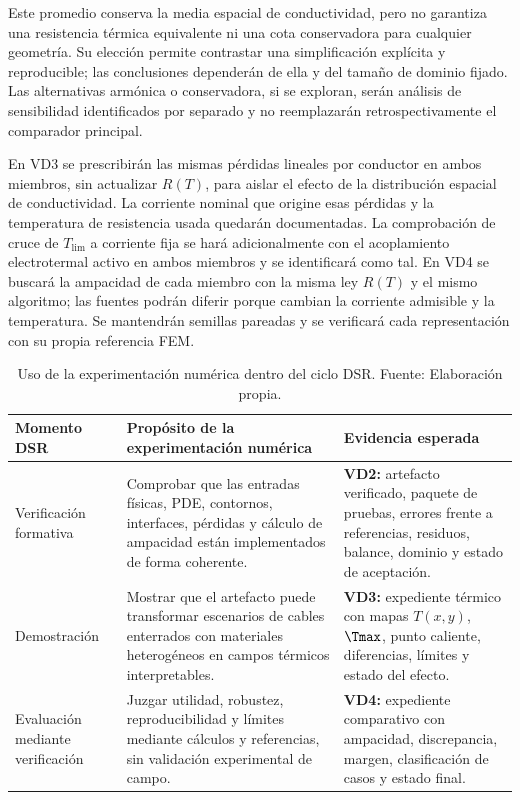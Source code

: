 Este promedio conserva la media espacial de conductividad, pero no garantiza una resistencia térmica equivalente ni una cota conservadora para cualquier geometría. Su elección permite contrastar una simplificación explícita y reproducible; las conclusiones dependerán de ella y del tamaño de dominio fijado. Las alternativas armónica o conservadora, si se exploran, serán análisis de sensibilidad identificados por separado y no reemplazarán retrospectivamente el comparador principal.

En VD3 se prescribirán las mismas pérdidas lineales por conductor en ambos miembros, sin actualizar $R(T)$, para aislar el efecto de la distribución espacial de conductividad. La corriente nominal que origine esas pérdidas y la temperatura de resistencia usada quedarán documentadas. La comprobación de cruce de $T_{\mathrm{lim}}$ a corriente fija se hará adicionalmente con el acoplamiento electrotermal activo en ambos miembros y se identificará como tal. En VD4 se buscará la ampacidad de cada miembro con la misma ley $R(T)$ y el mismo algoritmo; las fuentes podrán diferir porque cambian la corriente admisible y la temperatura. Se mantendrán semillas pareadas y se verificará cada representación con su propia referencia FEM.

\begin{table}[htbp]
\centering
\caption{Uso de la experimentación numérica dentro del ciclo DSR. Fuente: Elaboración propia.}
\label{tab:experimentacion-dsr}
\begin{tabularx}{\textwidth}{L{3.2cm}Y Y}
\toprule
\textbf{Momento DSR} & \textbf{Propósito de la experimentación numérica} & \textbf{Evidencia esperada} \\
\midrule
Verificación formativa & Comprobar que las entradas físicas, PDE, contornos, interfaces, pérdidas y cálculo de ampacidad están implementados de forma coherente. & \textbf{VD2:} artefacto verificado, paquete de pruebas, errores frente a referencias, residuos, balance, dominio y estado de aceptación. \\
Demostración & Mostrar que el artefacto puede transformar escenarios de cables enterrados con materiales heterogéneos en campos térmicos interpretables. & \textbf{VD3:} expediente térmico con mapas $T(x,y)$, $\Tmax$, punto caliente, diferencias, límites y estado del efecto. \\
Evaluación mediante verificación & Juzgar utilidad, robustez, reproducibilidad y límites mediante cálculos y referencias, sin validación experimental de campo. & \textbf{VD4:} expediente comparativo con ampacidad, discrepancia, margen, clasificación de casos y estado final. \\
\bottomrule
\end{tabularx}
\end{table}

